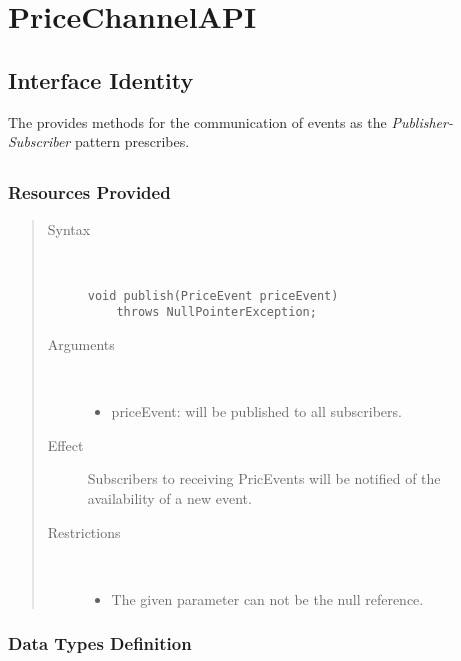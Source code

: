 \section{PriceChannelAPI}
\label{api:other-price-channel-api}

\subsection{Interface Identity}

\npar The  provides methods for the communication of
events as the \emph{Publisher-Subscriber} pattern prescribes.

\subsection{}

\subsubsection{Resources Provided}

\begin{quote}
	\begin{description}
		\item[Syntax] \
		\begin{verbatim}
void publish(PriceEvent priceEvent)
    throws NullPointerException;
		\end{verbatim}
		\item[Arguments] \
		\begin{itemize}
		  \item priceEvent: will be published to all subscribers.
		\end{itemize}
		\item[Effect] Subscribers to receiving PricEvents will be notified of
		the availability of a new event. 
		\item[Restrictions] \
		\begin{itemize}
		  \item The given parameter can not be the null reference.
		\end{itemize}
	\end{description}
\end{quote}

\subsubsection{Data Types Definition}

